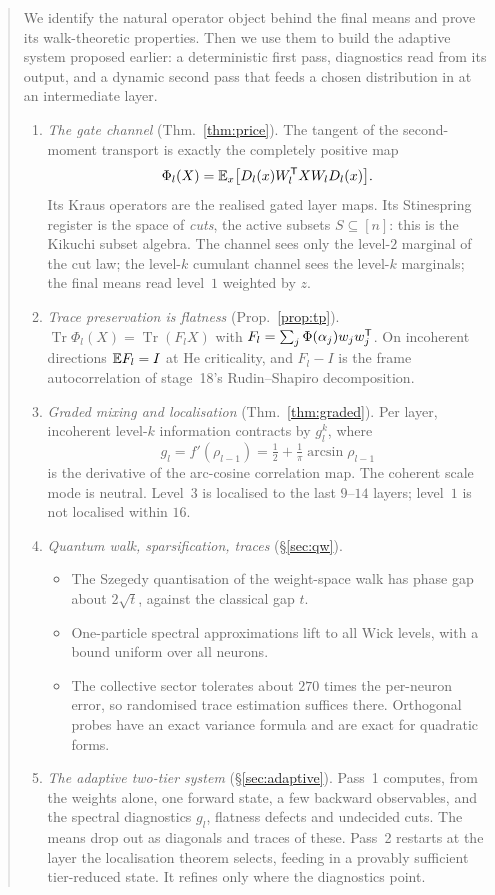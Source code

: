 \begin{abstract}
We identify the natural operator object behind the final means and prove its walk-theoretic properties.
Then we use them to build the adaptive system proposed earlier: a deterministic first pass, diagnostics
read from its output, and a dynamic second pass that feeds a chosen distribution in at an intermediate
layer.
\begin{enumerate}[label=(\arabic*),leftmargin=1.6em,itemsep=1pt,topsep=1pt]
\item \emph{The gate channel} (Thm.~\ref{thm:price}). The tangent of the second-moment transport is exactly
the completely positive map
\[
\Phi_l(X)=\E_x\big[D_l(x)W_l\T XW_lD_l(x)\big].
\]
Its Kraus operators are the realised gated layer maps. Its Stinespring register is the space of
\emph{cuts}, the active subsets $S\subseteq[n]$: this is the Kikuchi subset algebra. The channel sees only the
level-$2$ marginal of the cut law; the level-$k$ cumulant channel sees the level-$k$ marginals; the final
means read level~$1$ weighted by $z$.
\item \emph{Trace preservation is flatness} (Prop.~\ref{prop:tp}). $\operatorname{Tr}\Phi_l(X)=\operatorname{Tr}(F_lX)$ with
$F_l=\sum_j\Phi(\alpha_j)w_jw_j\T$. On incoherent directions $\E F_l=I$ at He criticality, and $F_l-I$ is the frame
autocorrelation of stage~18's Rudin--Shapiro decomposition.
\item \emph{Graded mixing and localisation} (Thm.~\ref{thm:graded}). Per layer, incoherent level-$k$
information contracts by $g_l^k$, where
\[
g_l=f'(\rho_{l-1})=\tfrac12+\tfrac1\pi\arcsin\rho_{l-1}
\]
is the derivative of the arc-cosine correlation map. The coherent scale mode is neutral. Level~$3$ is
localised to the last $9$--$14$ layers; level~$1$ is not localised within $16$.
\item \emph{Quantum walk, sparsification, traces} (\S\ref{sec:qw}).
\begin{itemize}[leftmargin=1.2em,itemsep=0pt,topsep=1pt]
\item The Szegedy quantisation of the weight-space walk has phase gap about $2\sqrt t$, against the classical
gap $t$.
\item One-particle spectral approximations lift to all Wick levels, with a bound uniform over all neurons.
\item The collective sector tolerates about $270$ times the per-neuron error, so randomised trace estimation
suffices there. Orthogonal probes have an exact variance formula and are exact for quadratic forms.
\end{itemize}
\item \emph{The adaptive two-tier system} (\S\ref{sec:adaptive}). Pass~1 computes, from the weights alone,
one forward state, a few backward observables, and the spectral diagnostics $g_l$, flatness defects and
undecided cuts. The means drop out as diagonals and traces of these. Pass~2 restarts at the layer the
localisation theorem selects, feeding in a provably sufficient tier-reduced state. It refines only where
the diagnostics point.
\end{enumerate}
\end{abstract}
